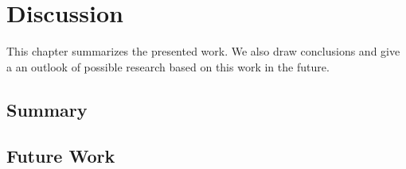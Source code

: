 \chapter{Discussion} \label{chapter:conclusions}

This chapter summarizes the presented work. We also draw conclusions and give a an outlook of possible research based on this work in the future.

\section{Summary}

\section{Future Work}





